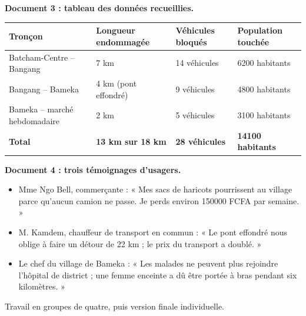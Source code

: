 \documentclass[11pt]{article}
\newcounter{popsec}
\newcounter{popsub}
\newcommand{\courssub}[1]{%
  \stepcounter{popsub}%
  \par\vspace{9pt}\noindent{\popxbold\fontsize{11.5}{13}\selectfont\color{popink}{\color{poporange}\thepopsec.\thepopsub}\hspace{6pt}#1}\par\nopagebreak\vspace{4pt}
}
\begin{document}
\textbf{Document 3 : tableau des données recueillies.}

\begin{center}
\begin{tabularx}{\linewidth}{|l|X|X|X|}\hline
\rowcolor{popblueL} \textbf{Tronçon} & \textbf{Longueur endommagée} & \textbf{Véhicules bloqués} & \textbf{Population touchée} \\ \hline
Batcham-Centre -- Bangang & 7 km & 14 véhicules & \num{6200} habitants \\ \hline
Bangang -- Bameka & 4 km (pont effondré) & 9 véhicules & \num{4800} habitants \\ \hline
Bameka -- marché hebdomadaire & 2 km & 5 véhicules & \num{3100} habitants \\ \hline
\textbf{Total} & \textbf{13 km sur 18 km} & \textbf{28 véhicules} & \textbf{\num{14100} habitants} \\ \hline
\end{tabularx}
\end{center}

\textbf{Document 4 : trois témoignages d'usagers.}

\begin{itemize}
\item Mme Ngo Bell, commerçante : « Mes sacs de haricots pourrissent au village parce qu'aucun camion ne passe. Je perds environ \num{150000} FCFA par semaine. »
\item M. Kamdem, chauffeur de transport en commun : « Le pont effondré nous oblige à faire un détour de 22 km ; le prix du transport a doublé. »
\item Le chef du village de Bameka : « Les malades ne peuvent plus rejoindre l'hôpital de district ; une femme enceinte a dû être portée à bras pendant six kilomètres. »
\end{itemize}

\courssub{Consignes}

Travail en groupes de quatre, puis version finale individuelle.
\end{document}
